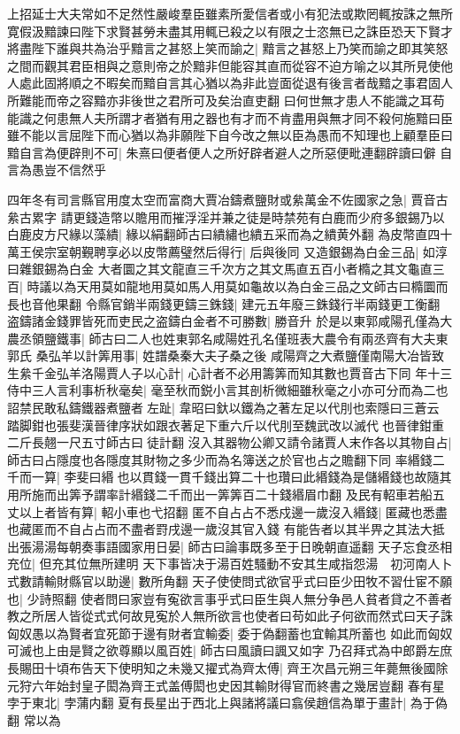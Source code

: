 上招延士大夫常如不足然性嚴峻羣臣雖素所愛信者或小有犯法或欺罔輒按誅之無所寛假汲黯諫曰陛下求賢甚勞未盡其用輒已殺之以有限之士恣無已之誅臣恐天下賢才將盡陛下誰與共為治乎黯言之甚怒上笑而諭之|{
	黯言之甚怒上乃笑而諭之即其笑怒之間而觀其君臣相與之意則帝之於黯非但能容其直而從容不迫方喻之以其所見使他人處此固將順之不暇矣而黯自言其心猶以為非此豈面從退有後言者哉黯之事君固人所難能而帝之容黯亦非後世之君所可及矣治直吏翻}
曰何世無才患人不能識之耳苟能識之何患無人夫所謂才者猶有用之器也有才而不肯盡用與無才同不殺何施黯曰臣雖不能以言屈陛下而心猶以為非願陛下自今改之無以臣為愚而不知理也上顧羣臣曰黯自言為便辟則不可|{
	朱熹曰便者便人之所好辟者避人之所惡便毗連翻辟讀曰僻}
自言為愚豈不信然乎

四年冬有司言縣官用度太空而富商大賈冶鑄煮鹽財或絫萬金不佐國家之急|{
	賈音古絫古累字}
請更錢造幣以贍用而摧浮淫并兼之徒是時禁苑有白鹿而少府多銀錫乃以白鹿皮方尺緣以藻繢|{
	緣以絹翻師古曰繢繡也繢五采而為之繢黄外翻}
為皮幣直四十萬王侯宗室朝覲聘享必以皮幣薦璧然后得行|{
	后與後同}
又造銀錫為白金三品|{
	如淳曰雜銀錫為白金}
大者圜之其文龍直三千次方之其文馬直五百小者橢之其文龜直三百|{
	時議以為天用莫如龍地用莫如馬人用莫如龜故以為白金三品之文師古曰橢圜而長也音他果翻}
令縣官銷半兩錢更鑄三銖錢|{
	建元五年廢三銖錢行半兩錢更工衡翻}
盗鑄諸金錢罪皆死而吏民之盗鑄白金者不可勝數|{
	勝音升}
於是以東郭咸陽孔僅為大農丞領鹽鐵事|{
	師古曰二人也姓東郭名咸陽姓孔名僅班表大農令有兩丞齊有大夫東郭氏}
桑弘羊以計筭用事|{
	姓譜桑秦大夫子桑之後}
咸陽齊之大煮鹽僅南陽大冶皆致生絫千金弘羊洛陽賈人子以心計|{
	心計者不必用籌筭而知其數也賈音古下同}
年十三侍中三人言利事析秋毫矣|{
	毫至秋而鋭小言其剖析微細雖秋毫之小亦可分而為二也}
詔禁民敢私鑄鐵器煮鹽者左趾|{
	韋昭曰釱以鐵為之著左足以代刖也索隱曰三蒼云踏脚鉗也張斐漢晉律序狀如跟衣著足下重六斤以代刖至魏武改以滅代也晉律鉗重二斤長翹一尺五寸師古曰徒計翻}
沒入其器物公卿又請令諸賈人末作各以其物自占|{
	師古曰占隱度也各隱度其財物之多少而為名簿送之於官也占之贍翻下同}
率緡錢二千而一算|{
	李斐曰緡也以貫錢一貫千錢出算二十也瓚曰此緡錢為是儲緡錢也故隨其用所施而出筭予謂率計緡錢二千而出一筭筭百二十錢緡眉巾翻}
及民有軺車若船五丈以上者皆有算|{
	軺小車也弋招翻}
匿不自占占不悉戍邊一歲沒入緡錢|{
	匿藏也悉盡也藏匿而不自占占而不盡者罸戌邊一歲沒其官入錢}
有能告者以其半畀之其法大抵出張湯湯每朝奏事語國家用日晏|{
	師古曰論事既多至于日晚朝直遥翻}
天子忘食丞相充位|{
	但充其位無所建明}
天下事皆决于湯百姓騷動不安其生咸指怨湯　初河南人卜式數請輸財縣官以助邊|{
	數所角翻}
天子使使問式欲官乎式曰臣少田牧不習仕宦不願也|{
	少詩照翻}
使者問曰家豈有寃欲言事乎式曰臣生與人無分争邑人貧者貸之不善者教之所居人皆從式式何故見寃於人無所欲言也使者曰苟如此子何欲而然式曰天子誅匈奴愚以為賢者宜死節于邊有財者宜輸委|{
	委于偽翻蓄也宜輸其所蓄也}
如此而匈奴可滅也上由是賢之欲尊顯以風百姓|{
	師古曰風讀曰諷又如字}
乃召拜式為中郎爵左庶長賜田十頃布告天下使明知之未幾又擢式為齊太傅|{
	齊王次昌元朔三年薨無後國除元狩六年始封皇子閎為齊王式盖傅閎也史因其輸財得官而終書之幾居豈翻}
春有星孛于東北|{
	孛蒲内翻}
夏有長星出于西北上與諸將議曰翕侯趙信為單于畫計|{
	為于偽翻}
常以為

